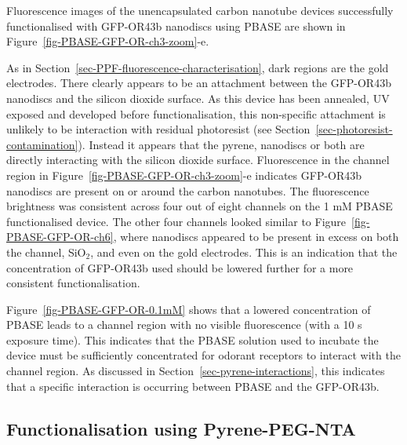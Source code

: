 \documentclass[
  a4paper,
]{scrbook}
\begin{document}
Fluorescence images of the unencapsulated carbon nanotube devices
successfully functionalised with GFP-OR43b nanodiscs using PBASE are
shown in Figure~\ref{fig-PBASE-GFP-OR-ch3-zoom}-e.

As in Section~\ref{sec-PPF-fluorescence-characterisation}, dark regions
are the gold electrodes. There clearly appears to be an attachment
between the GFP-OR43b nanodiscs and the silicon dioxide surface. As this
device has been annealed, UV exposed and developed before
functionalisation, this non-specific attachment is unlikely to be
interaction with residual photoresist (see
Section~\ref{sec-photoresist-contamination}). Instead it appears that
the pyrene, nanodiscs or both are directly interacting with the silicon
dioxide surface. Fluorescence in the channel region in
Figure~\ref{fig-PBASE-GFP-OR-ch3-zoom}-e indicates GFP-OR43b nanodiscs
are present on or around the carbon nanotubes. The fluorescence
brightness was consistent across four out of eight channels on the 1 mM
PBASE functionalised device. The other four channels looked similar to
Figure~\ref{fig-PBASE-GFP-OR-ch6}, where nanodiscs appeared to be
present in excess on both the channel, SiO\(_2\), and even on the gold
electrodes. This is an indication that the concentration of GFP-OR43b
used should be lowered further for a more consistent functionalisation.

Figure~\ref{fig-PBASE-GFP-OR-0.1mM} shows that a lowered concentration
of PBASE leads to a channel region with no visible fluorescence (with a
10 s exposure time). This indicates that the PBASE solution used to
incubate the device must be sufficiently concentrated for odorant
receptors to interact with the channel region. As discussed in
Section~\ref{sec-pyrene-interactions}, this indicates that a specific
interaction is occurring between PBASE and the GFP-OR43b.

\hypertarget{sec-NTA-functionalisation}{%
\subsection{Functionalisation using
Pyrene-PEG-NTA}\label{sec-NTA-functionalisation}}
\end{document}
